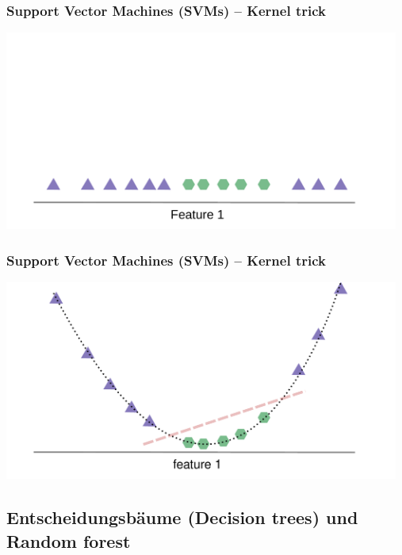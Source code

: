 \documentclass[aspectratio=169]{beamer}
\begin{document}
\begin{frame}
  \frametitle{Support Vector Machines (SVMs) -- Kernel trick}
  \begin{center}
    \includegraphics[width=13.0cm]{images/svm_kernel_trick_2.pdf}
  \end{center}
\end{frame}

\begin{frame}
  \frametitle{Support Vector Machines (SVMs) -- Kernel trick}
  \begin{center}
    \includegraphics[width=13.0cm]{images/svm_kernel_trick_3.pdf}
  \end{center}
\end{frame}

\subsection{Entscheidungsbäume (Decision trees) und Random forest}

\setcounter{tocdepth}{2}
\begin{frame}{}
  \tableofcontents[currentsubsection,hideothersubsections,
    subsectionstyle=show/shaded]
\end{frame}
\end{document}

